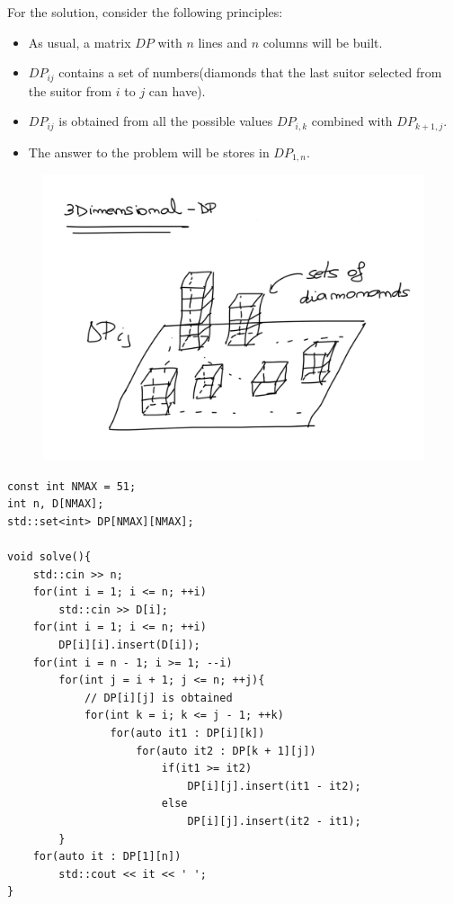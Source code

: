 \documentclass[letterpaper]{article}
\begin{document}
For the solution, consider the following principles:

\begin{itemize}
    \item As usual, a matrix $DP$ with $n$ lines and $n$ columns will be built.

    \item $DP_{ij}$ contains a set of numbers(diamonds that the last suitor selected from the suitor from $i$ to $j$ can have).

    \item $DP_{ij}$ is obtained from all the possible values $DP_{i,k}$ combined with $DP_{k + 1, j}$.

    \item The answer to the problem will be stores in $DP_{1, n}$.
\end{itemize}


\begin{figure} [h!]
\centering
\includegraphics[width=1\textwidth]{pngOfDiagrams/dairyprincess.png}
\end{figure}


\begin{lstlisting}
const int NMAX = 51;
int n, D[NMAX];
std::set<int> DP[NMAX][NMAX];

void solve(){
    std::cin >> n;
    for(int i = 1; i <= n; ++i)
        std::cin >> D[i];
    for(int i = 1; i <= n; ++i)
        DP[i][i].insert(D[i]);
    for(int i = n - 1; i >= 1; --i)
        for(int j = i + 1; j <= n; ++j){
            // DP[i][j] is obtained
            for(int k = i; k <= j - 1; ++k)
                for(auto it1 : DP[i][k])
                    for(auto it2 : DP[k + 1][j])
                        if(it1 >= it2)
                            DP[i][j].insert(it1 - it2);
                        else
                            DP[i][j].insert(it2 - it1);
        }
    for(auto it : DP[1][n])
        std::cout << it << ' ';
}
\end{lstlisting}
\end{document}
